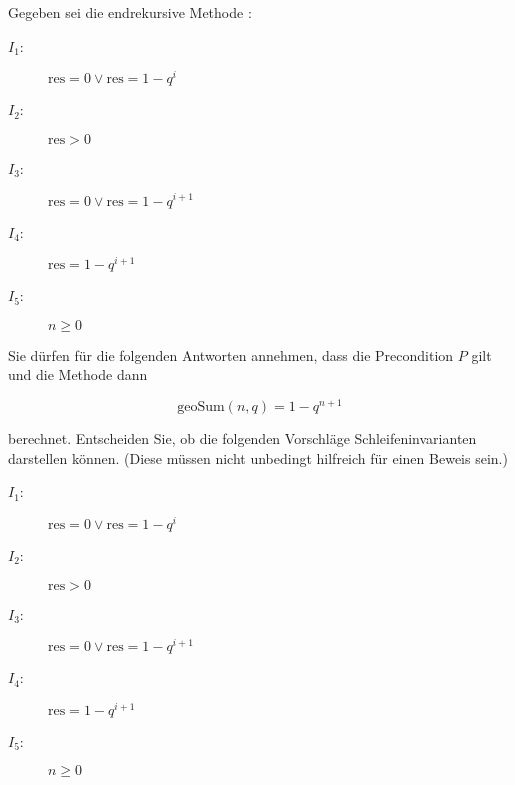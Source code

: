 \documentclass{bschlangaul-aufgabe}
\begin{document}
\let\wp=\liWpKalkuelOhneMathe

Gegeben sei die endrekursive Methode :


\begin{description}
\item[$I_1$:] $\text{res} = 0 \lor \text{res} = 1 - q^i$

\item[$I_2$:] $\text{res} > 0$

\item[$I_3$:] $\text{res} = 0 \lor \text{res} = 1 - q^{i+1}$

\item[$I_4$:] $\text{res} = 1 - q^{i+1}$

\item[$I_5$:] $n \geq 0$
\end{description}

\noindent
Sie dürfen für die folgenden Antworten annehmen, dass die Precondition
$P$ gilt und die Methode dann

\begin{displaymath}
\text{geoSum}(n, q) = 1 - q^{n+1}
\end{displaymath}

\noindent
berechnet. Entscheiden Sie, ob die folgenden Vorschläge
Schleifeninvarianten darstellen können. (Diese müssen nicht unbedingt
hilfreich für einen Beweis sein.)

\begin{description}
\item[$I_1$:] $\text{res} = 0 \lor \text{res} = 1 - q^i$

\item[$I_2$:] $\text{res} > 0$

\item[$I_3$:] $\text{res} = 0 \lor \text{res} = 1 - q^{i+1}$

\item[$I_4$:] $\text{res} = 1 - q^{i+1}$

\item[$I_5$:] $n \geq 0$
\end{description}
\end{document}
